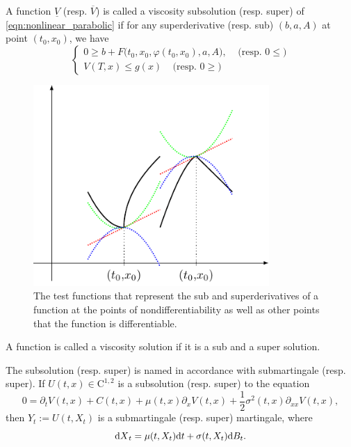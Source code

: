 \documentclass[11pt]{book}
\newcommand{\dd}{\text{\normalfont d}}
\newcommand{\dt}{\text{\normalfont d}t}
\newcommand{\dX}{\text{\normalfont d}X}
\begin{document}
A function $\underline{V}$ (resp. $\overline{V}$) is called a viscosity subsolution (resp. super) of \eqref{eqn:nonlinear_parabolic} if for any superderivative (resp. sub) $(b,a,A)$ at point $(t_0,x_0)$, we have 
\begin{equation}
\begin{cases}		0\ge b+F\big(t_0,x_0,\varphi(t_0,x_0),a,A\big), ~~~~~\textrm{(resp. $0\le $)}\\
		V(T,x)\le g(x) ~~~~~\textrm{(resp. $0\ge $)}
\end{cases}
\end{equation}


\begin{figure}[ht!]
\centering
\includegraphics[width=0.8\textwidth]{Figs/viscosity}
\caption{The test functions that represent the sub and superderivatives of a function at the points of nondifferentiability as well as other points that the function is differentiable.}
\label{fig:viscosity}
\end{figure}
A function is called a viscosity solution if it is a sub and a super solution. 

\begin{rem}
The subsolution (resp. super) is named in accordance with submartingale (resp. super). If $U(t,x)\in\mathrm{C}^{1,2}$ is a subsolution (resp. super) to the equation 
\begin{equation}
		0=\partial_{t}V(t,x)+C(t,x)+\mu(t,x)\partial_{x}V(t,x)+\frac12{\sigma^2(t,x)}\partial_{xx}V(t,x),
\end{equation}
then $Y_t:=U(t,X_t)$ is a submartingale (resp. super) martingale, where
\begin{equation}
{\dX}_t=\mu(t,X_t){{\dt}}+\sigma(t,X_t){\dd}B_t.
\end{equation}
\end{rem}
\end{document}
